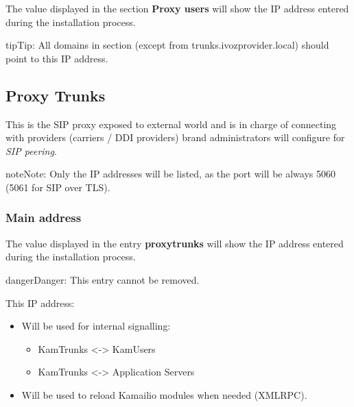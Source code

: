 \documentclass[letterpaper,10pt,english]{sphinxmanual}
\begin{document}
The value displayed in the section \textbf{Proxy users} will show the IP address
entered during the installation process.

\begin{notice}{tip}{Tip:}
All domains in  section (except from trunks.ivozprovider.local) should point to this IP address.
\end{notice}


\subsection{Proxy Trunks}
\label{administration_portal/platform/infrastructure/proxy_trunks:proxy-trunks}\label{administration_portal/platform/infrastructure/proxy_trunks::doc}
This is the SIP proxy exposed to external world and is in charge of connecting
with providers (carriers / DDI providers) brand administrators will configure for \emph{SIP peering}.

\begin{notice}{note}{Note:}
Only the IP addresses will be listed, as the port will be always 5060
(5061 for SIP over TLS).
\end{notice}


\subsubsection{Main address}
\label{administration_portal/platform/infrastructure/proxy_trunks:main-address}
The value displayed in the entry \textbf{proxytrunks} will show the IP address
entered during the installation process.

\begin{notice}{danger}{Danger:}
This entry cannot be removed.
\end{notice}

This IP address:
\begin{itemize}
\item {} 
Will be used for internal signalling:
\begin{itemize}
\item {} 
KamTrunks \textless{}-\textgreater{} KamUsers

\item {} 
KamTrunks \textless{}-\textgreater{} Application Servers

\end{itemize}

\item {} 
Will be used to reload Kamailio modules when needed (XMLRPC).

\end{itemize}
\end{document}
